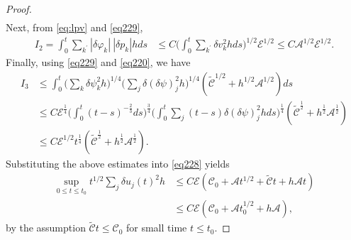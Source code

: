 \documentclass[a4paper,oneside,11pt]{article}
\numberwithin{equation}{section}
\begin{document}
\begin{proof}
\[\begin{aligned}
\end{aligned}\]
Next, from \eqref{eq:lpv} and \eqref{eq229},
\[\begin{aligned}
I_2=\int_{0}^{t}\sum_{k^{\prime}}|\delta\varphi_{k}|~|\delta p_{k}| hds &\leq C\Big(\int_{0}^{t}\sum\limits_{k^{\prime}}\delta v_{k}^{2}hds\Big)^{1/2}\mathscr{E}^{1/2} \leq C\mathscr{A}^{1/2}\mathscr{E}^{1/2}.
\end{aligned}\]
Finally, using \eqref{eq229} and \eqref{eq220}, we have
\[\begin{aligned}
I_3&\leq\int_{0}^{t}\Big(\sum_{k}\delta\psi_{k}^{2}h\Big)^{1/4}\Big(\sum_{j}\delta(\delta\psi)_{j}^{2}h\Big)^{1/4}(\tilde{\mathscr{C}}^{1/2}+h^{1/2}{\mathscr{A}}^{1/2})ds \\
&\leq C\mathscr{E}^{\frac14}\Big(\int_{0}^{t}(t-s)^{-\frac23}ds\Big)^{\frac34}\Big(\int_{0}^{t}\sum_{j}(t-s)\delta(\delta\psi)_{j}^{2}hds\Big)^{\frac14}(\tilde{\mathscr{C}}^{\frac12}+h^{\frac12}{\mathscr{A}}^{\frac12})\\
&\leq C\mathscr{E}^{1/2}t^{\frac14}(\tilde{\mathscr{C}}^{\frac12}+h^{\frac12}{\mathscr{A}}^{\frac12}).
\end{aligned}\]
Substituting the above estimates into \eqref{eq228} yields
\begin{equation}\label{eq230}
\begin{aligned}
  \sup\limits_{0\leq t\leq t_{0}}t^{1/2}\sum\limits_{j}\delta u_{j}(t)^{2}h&\leq C{\mathscr{E}}(\mathscr{C}_{0}+\mathscr{A}t^{1/2}+\tilde{\mathscr{C}}t+ h\mathscr{A}t)\\
  &\leq C{\mathscr{E}}(\mathscr{C}_{0}+\mathscr{A}t_0^{1/2}+ h\mathscr{A}),
\end{aligned}
\end{equation}
by the assumption $\tilde{\mathscr{C}}t\leq \mathscr{C}_{0}$ for small time $t\leq t_0$.


\end{proof}
\end{document}
